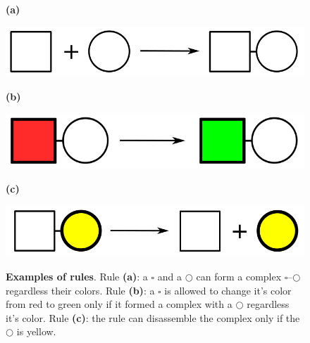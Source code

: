 \documentclass[12pt]{fithesis2}
\begin{document}
\begin{figure}[!h]
\begin{center}
\begin{minipage}[l]{0.1\textwidth}
    \textbf{(a)}
  \end{minipage}
  \begin{minipage}[r]{0.6\textwidth}
    {\hspace*{0.8cm}\includegraphics[scale=0.2]{rule_complex}}
\end{minipage}

\begin{minipage}[l]{0.1\textwidth}
    \textbf{(b)}
  \end{minipage}
  \begin{minipage}[r]{0.6\textwidth}
    {\hspace*{1.35cm}\includegraphics[scale=0.2]{rule_change}}
\end{minipage}

\begin{minipage}[l]{0.1\textwidth}
    \textbf{(c)}
  \end{minipage}
  \begin{minipage}[r]{0.6\textwidth}
    {\hspace*{1.3cm}\includegraphics[scale=0.2]{rule_diss}}
\end{minipage}
\caption{\textbf{Examples of rules}. Rule \textbf{(a)}: a $\square$ and a $\bigcirc$ can form a complex $\square$--$\bigcirc$ regardless their colors. Rule \textbf{(b)}: a $\square$ is allowed to change it's color from red to green only if it formed a complex with a $\bigcirc$ regardless it's color. Rule \textbf{(c)}: the rule can disassemble the complex only if the $\bigcirc$ is yellow.}
\label{rules:fig}
\end{center}
\end{figure}
\end{document}
